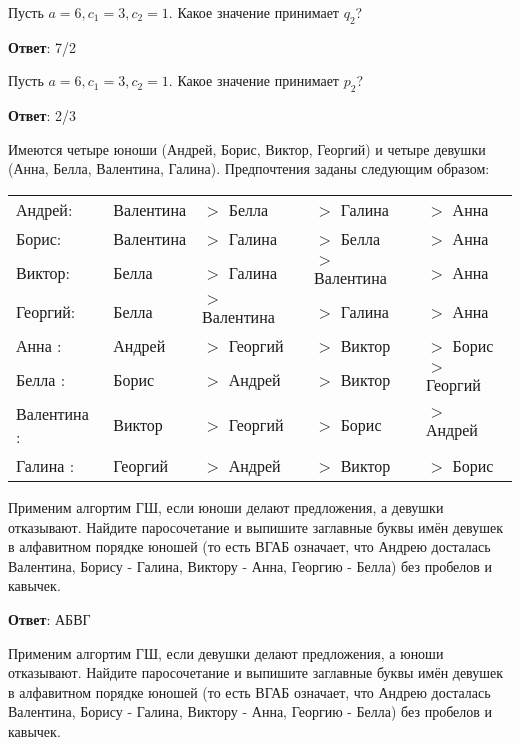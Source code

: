 \task
Пусть $a = 6, c_1 = 3, c_2 = 1$. Какое значение принимает $q_2$?

\textbf{Ответ}: 
7/2

\solution %

\task Пусть $a=6, c_1=3, c_2=1$. Какое значение принимает $p_2$?

\textbf{Ответ}: 
2/3

\solution %

\task
Имеются четыре юноши (Андрей, Борис, Виктор, Георгий) и четыре девушки (Анна, Белла, Валентина, Галина). Предпочтения заданы следующим образом:

\begin{tabular}{lllll}
	\hline
	Андрей: &Валентина &$>$ Белла &$>$ Галина &$>$ Анна \\
	
	Борис:&Валентина &$>$ Галина &$>$ Белла &$>$ Анна \\
	
	Виктор:&Белла &$>$ Галина &$>$ Валентина &$>$ Анна \\
	
	Георгий:&Белла&$>$ Валентина &$>$ Галина &$>$ Анна \\
	
	Анна :&Андрей &$>$ Георгий &$>$ Виктор &$>$ Борис \\
	
	Белла :&Борис &$>$ Андрей &$>$ Виктор &$>$ Георгий \\
	
	Валентина :&Виктор &$>$ Георгий &$>$ Борис &$>$ Андрей \\
	
	Галина :&Георгий &$>$ Андрей &$>$ Виктор &$>$ Борис \\
	\hline
\end{tabular}

Применим алгортим ГШ, если юноши делают предложения, а девушки отказывают. Найдите паросочетание и выпишите заглавные буквы имён девушек в алфавитном порядке юношей (то есть ВГАБ означает, что Андрею досталась Валентина, Борису - Галина, Виктору - Анна, Георгию - Белла) без пробелов и кавычек.

\textbf{Ответ}: 
АБВГ	%

\solution %

\task 
Применим алгортим ГШ, если девушки делают предложения, а юноши отказывают. Найдите паросочетание и выпишите заглавные буквы имён девушек в алфавитном порядке юношей (то есть ВГАБ означает, что Андрею досталась Валентина, Борису - Галина, Виктору - Анна, Георгию - Белла) без пробелов и кавычек.


